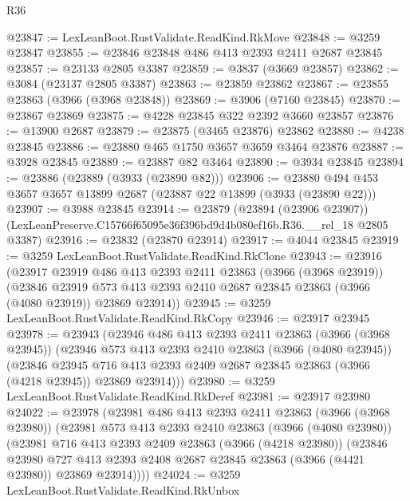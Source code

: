 \begin{lexlean}{R36}
\begin{coremodule}
@23847 := LexLeanBoot.RustValidate.ReadKind.RkMove
@23848 := @3259 @23847
@23855 := @23846 @23848 @486 @413 @2393 @2411 @2687 @23845
@23857 := @23133 @2805 @3387
@23859 := @3837 (@3669 @23857)
@23862 := @3084 (@23137 @2805 @3387)
@23863 := @23859 @23862
@23867 := @23855 @23863 (@3966 (@3968 @23848))
@23869 := @3906 (@7160 @23845)
@23870 := @23867 @23869
@23875 := @4228 @23845 @322 @2392 @3660 @23857
@23876 := @13900 @2687
@23879 := @23875 (@3465 @23876) @23862
@23880 := @4238 @23845
@23886 := @23880 @465 @1750 @3657 @3659 @3464 @23876
@23887 := @3928 @23845
@23889 := @23887 @82 @3464
@23890 := @3934 @23845
@23894 := @23886 (@23889 (@3933 (@23890 @82)))
@23906 := @23880 @494 @453 @3657 @3657 @13899 @2687 (@23887 @22 @13899 (@3933 (@23890 @22)))
@23907 := @3988 @23845
@23914 := @23879
    (@23894 (@23906 @23907))
    (LexLeanPreserve.C15766f65095e36f396bd9d4b080ef16b.R36.__rel_18 @2805 @3387)
@23916 := @23832 (@23870 @23914)
@23917 := @4044 @23845
@23919 := @3259 LexLeanBoot.RustValidate.ReadKind.RkClone
@23943 := @23916
    (@23917
      @23919
      @486
      @413
      @2393
      @2411
      @23863
      (@3966 (@3968 @23919))
      (@23846
        @23919
        @573
        @413
        @2393
        @2410
        @2687
        @23845
        @23863
        (@3966 (@4080 @23919))
        @23869
        @23914))
@23945 := @3259 LexLeanBoot.RustValidate.ReadKind.RkCopy
@23946 := @23917 @23945
@23978 := @23943
    (@23946
      @486
      @413
      @2393
      @2411
      @23863
      (@3966 (@3968 @23945))
      (@23946
        @573
        @413
        @2393
        @2410
        @23863
        (@3966 (@4080 @23945))
        (@23846
          @23945
          @716
          @413
          @2393
          @2409
          @2687
          @23845
          @23863
          (@3966 (@4218 @23945))
          @23869
          @23914)))
@23980 := @3259 LexLeanBoot.RustValidate.ReadKind.RkDeref
@23981 := @23917 @23980
@24022 := @23978
    (@23981
      @486
      @413
      @2393
      @2411
      @23863
      (@3966 (@3968 @23980))
      (@23981
        @573
        @413
        @2393
        @2410
        @23863
        (@3966 (@4080 @23980))
        (@23981
          @716
          @413
          @2393
          @2409
          @23863
          (@3966 (@4218 @23980))
          (@23846
            @23980
            @727
            @413
            @2393
            @2408
            @2687
            @23845
            @23863
            (@3966 (@4421 @23980))
            @23869
            @23914))))
@24024 := @3259 LexLeanBoot.RustValidate.ReadKind.RkUnbox

\end{coremodule}
\end{lexlean}

